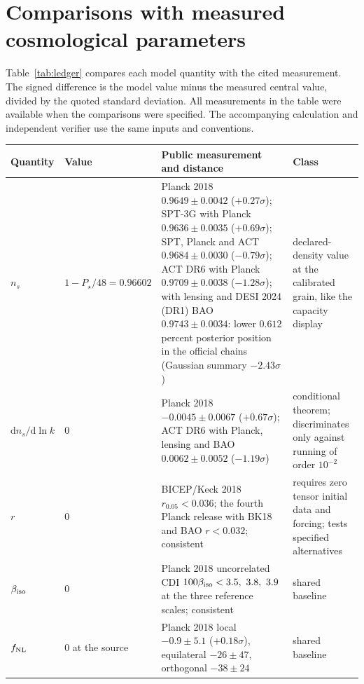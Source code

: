 \documentclass[11pt]{article}
\begin{document}
\section{Comparisons with measured cosmological parameters}
\label{sec:ledger}

Table~\ref{tab:ledger} compares each model quantity with the cited
measurement. The signed difference is the model value minus the measured
central value, divided by the quoted standard deviation. All measurements in
the table were available when the comparisons were specified. The accompanying
calculation and independent verifier use the same inputs and conventions.

\clearpage
\begin{table}[!htbp]
\centering\small
\setlength{\tabcolsep}{4pt}
\begin{tabularx}{\textwidth}{@{}l>{\raggedright\arraybackslash}p{}>{\raggedright\arraybackslash}X>{\raggedright\arraybackslash}p{}@{}}
\toprule
Quantity & Value & Public measurement and distance & Class \\
\midrule
\(n_s\) & \(1-P_\star/48=0.96602\) &
Planck 2018 \(0.9649\pm0.0042\) (\(+0.27\sigma\)); SPT-3G with Planck
\(0.9636\pm0.0035\) (\(+0.69\sigma\)); SPT, Planck and ACT
\(0.9684\pm0.0030\) (\(-0.79\sigma\)); ACT DR6 with Planck
\(0.9709\pm0.0038\) (\(-1.28\sigma\)); with lensing and DESI 2024 (DR1)
BAO \(0.9743\pm0.0034\): lower \(0.612\) percent posterior position in the
official chains (Gaussian summary \(-2.43\sigma\)) &
declared-density value at the calibrated grain, like the capacity display \\
\(\mathrm dn_s/\mathrm d\ln k\) & \(0\) &
Planck 2018 \(-0.0045\pm0.0067\) (\(+0.67\sigma\)); ACT DR6 with Planck,
lensing and BAO \(0.0062\pm0.0052\) (\(-1.19\sigma\)) &
conditional theorem; discriminates only against running of order \(10^{-2}\) \\
\(r\) & \(0\) &
BICEP/Keck 2018 \(r_{0.05}<0.036\); the fourth Planck release with BK18 and BAO
\(r<0.032\); consistent &
requires zero tensor initial data and forcing; tests specified alternatives \\
\(\beta_{\rm iso}\) & \(0\) &
Planck 2018 uncorrelated CDI \(100\beta_{\rm iso}<3.5,\ 3.8,\ 3.9\) at the
three reference scales; consistent &
shared baseline \\
\(f_{\rm NL}\) & \(0\) at the source &
Planck 2018 local \(-0.9\pm5.1\) (\(+0.18\sigma\)), equilateral
\(-26\pm47\), orthogonal \(-38\pm24\) &
shared baseline \\

\end{tabularx}
\end{table}
\end{document}
